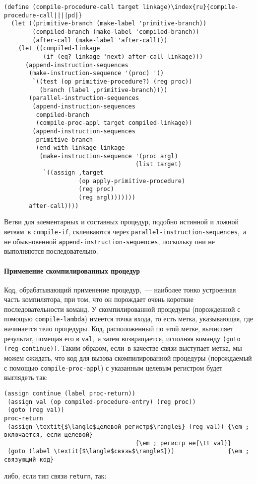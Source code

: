 \begin{Verbatim}[fontsize=\small]
(define (compile-procedure-call target linkage)\index{ru}{compile-procedure-call||||pd|}
  (let ((primitive-branch (make-label 'primitive-branch))
        (compiled-branch (make-label 'compiled-branch))
        (after-call (make-label 'after-call)))
    (let ((compiled-linkage
           (if (eq? linkage 'next) after-call linkage)))
      (append-instruction-sequences
       (make-instruction-sequence '(proc) '()
        `((test (op primitive-procedure?) (reg proc))
          (branch (label ,primitive-branch))))
       (parallel-instruction-sequences
        (append-instruction-sequences
         compiled-branch
         (compile-proc-appl target compiled-linkage))
        (append-instruction-sequences
         primitive-branch
         (end-with-linkage linkage
          (make-instruction-sequence '(proc argl)
                                     (list target)
           `((assign ,target
                     (op apply-primitive-procedure)
                     (reg proc)
                     (reg argl)))))))
       after-call))))
\end{Verbatim}
Ветви для элементарных и составных процедур, подобно истинной и ложной
ветвям~в {\tt compile-if}, склеиваются через
{\tt parallel-instruction-sequences},~а не обыкновенной
{\tt append-instruction-sequences}, по\-ско\-льку они не
выполняются последовательно.
\paragraph{Применение скомпилированных процедур}


Код, обрабатывающий применение процедур,~--- наиболее тонко
устроенная часть компилятора, при том, что он порождает очень
короткие последовательности команд.  У скомпилированной процедуры
(порожденной с помощью {\tt compile-lambda}) имеется точка
входа, то есть метка, указывающая, где начинается тело процедуры.
Код, расположенный по этой метке, вычисляет результат, помещая его в
{\tt val},~а затем возвращается, исполняя команду {\tt (goto
(reg continue))}.  Таким образом, если~в качестве связи
выступает метка, мы можем ожидать, что код для вызова скомпилированной
процедуры (порождаемый с помощью {\tt compile-proc-appl}) с
указанным целевым регистром будет выглядеть так:

\begin{Verbatim}[fontsize=\small]
 (assign continue (label proc-return))
 (assign val (op compiled-procedure-entry) (reg proc))
 (goto (reg val))
proc-return
 (assign \textit{$\langle$целевой регистр$\rangle$} (reg val)) {\em ; включается, если целевой} 
                                     {\em ; регистр не{\tt val}}
 (goto (label \textit{$\langle$связь$\rangle$}))               {\em ; связующий код}
\end{Verbatim}
либо, если тип связи {\tt return}, так:

